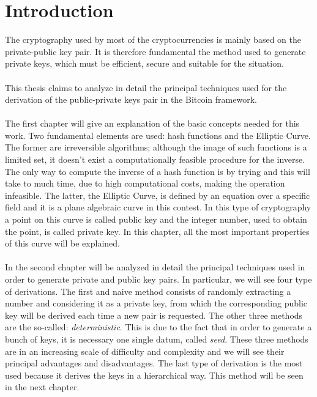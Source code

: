 
\chapter*{Introduction} %
\label{Introduction} %


The cryptography used by most of the cryptocurrencies is mainly based on the private-public key pair. It is therefore fundamental the method used to generate private keys, which must be efficient, secure and suitable for the situation.
\\ \\
This thesis claims to analyze in detail the principal techniques used for the derivation of the public-private keys pair in the Bitcoin framework.
\\ \\
The first chapter will give an explanation of the basic concepts needed for this work. Two fundamental elements are used: hash functions and the Elliptic Curve. The former are irreversible algorithms; although the image of such functions is a limited set, it doesn't exist a computationally feasible procedure for the inverse. The only way to compute the inverse of a hash function is by trying and this will take to much time, due to high computational costs, making the operation infeasible.
The latter, the Elliptic Curve, is defined by an equation over a specific field and it is a plane algebraic curve in this contest. In this type of cryptography a point on this curve is called public key and the integer number, used to obtain the point, is called private key. In this chapter, all the most important properties of this curve will be explained.
\\ \\
In the second chapter will be analyzed in detail the principal techniques used in order to generate private and public key pairs. In particular, we will see four type of derivations. The first and naive method consists of randomly extracting a number and considering it as a private key, from which the corresponding public key will be derived each time a new pair is requested. The other three methods are the so-called: \textit{deterministic}. This is due to the fact that in order to generate a bunch of keys, it is necessary one single datum, called \textit{seed}. These three methods are in an increasing scale of difficulty and complexity and we will see their principal advantages and disadvantages. The last type of derivation is the most used because it derives the keys in a hierarchical way. This method will be seen in the next chapter.
